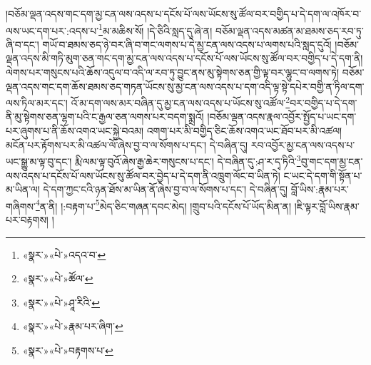 །བཅོམ་ལྡན་འདས་གང་དག་མྱ་ངན་ལས་འདས་པ་དངོས་པོ་ལས་ཡོངས་སུ་ཚོལ་བར་བགྱིད་པ་དེ་དག་ལ་འཁོར་བ་ལས་ཡང་དག་པར་:འདས་པ་\footnote{«སྣར་»«པེ་»འདའ་བ་}མ་མཆིས་སོ། །དེ་ཅིའི་སླད་དུ་ཞེ་ན། བཅོམ་ལྡན་འདས་མཚན་མ་ཐམས་ཅད་རབ་ཏུ་ཞི་བ་དང་། གཡོ་བ་ཐམས་ཅད་ཉེ་བར་ཞི་བ་གང་ལགས་པ་དེ་མྱ་ངན་ལས་འདས་པ་ལགས་པའི་སླད་དུའོ། །བཅོམ་ལྡན་འདས་མི་གཏི་མུག་ཅན་གང་དག་མྱ་ངན་ལས་འདས་པ་དངོས་པོ་ལས་ཡོངས་སུ་ཚོལ་བར་བགྱིད་པ་དེ་དག་ནི། ལེགས་པར་གསུངས་པའི་ཆོས་འདུལ་བ་འདི་ལ་རབ་ཏུ་བྱུང་ནས་མུ་སྟེགས་ཅན་གྱི་ལྟ་བར་ལྷུང་བ་ལགས་ཏེ། བཅོམ་ལྡན་འདས་གང་དག་ཆོས་ཐམས་ཅད་གཏན་ཡོངས་སུ་མྱ་ངན་ལས་འདས་པ་དག་འདི་ལྟ་སྟེ་དཔེར་བགྱི་ན་ཏིལ་དག་ལས་ཏིལ་མར་དང་། འོ་མ་དག་ལས་མར་བཞིན་དུ་མྱ་ངན་ལས་འདས་པ་ཡོངས་སུ་འཚོལ་\footnote{«སྣར་»«པེ་»ཚོལ་}བར་བགྱིད་པ་དེ་དག་ནི་མུ་སྟེགས་ཅན་ལྷག་པའི་ང་རྒྱལ་ཅན་ལགས་པར་བདག་སྨྲའོ། །བཅོམ་ལྡན་འདས་རྣལ་འབྱོར་སྤྱོད་པ་ཡང་དག་པར་ཞུགས་པ་ནི་ཆོས་འགའ་ཡང་སྐྱེ་བའམ། འགག་པར་མི་བགྱིད་ཅིང་ཆོས་འགའ་ཡང་ཐོབ་པར་མི་འཚལ། མངོན་པར་རྟོགས་པར་མི་འཚལ་ལོ་ཞེས་བྱ་བ་ལ་སོགས་པ་དང་། དེ་བཞིན་དུ། རབ་འབྱོར་མྱ་ངན་ལས་འདས་པ་ཡང་སྒྱུ་མ་ལྟ་བུ་དང་། རྨི་ལམ་ལྟ་བུའོ་ཞེས་རྒྱ་ཆེར་གསུངས་པ་དང་། དེ་བཞིན་དུ་:ཤ་ར་དྭ་ཏིའི་\footnote{«སྣར་»«པེ་»ཤཱ་རིའི་}བུ་གང་དག་མྱ་ངན་ལས་འདས་པ་དངོས་པོ་ལས་ཡོངས་སུ་ཚོལ་བར་བྱེད་པ་དེ་དག་ནི་འཁྲུག་ལོང་བ་ཡིན་ཏེ། ང་ཡང་དེ་དག་གི་སྟོན་པ་མ་ཡིན་ལ། དེ་དག་ཀྱང་ངའི་ཉན་ཐོས་མ་ཡིན་ནོ་ཞེས་བྱ་བ་ལ་སོགས་པ་དང་། དེ་བཞིན་དུ། བློ་ཡིས་:རྣམ་པར་གཞིགས་\footnote{«སྣར་»«པེ་»རྣམ་པར་ཞིག་}ན་ནི། །:བརྟག་པ་\footnote{«སྣར་»«པེ་»བརྟགས་པ་}མེད་ཅིང་གཞན་དབང་མེད། །གྲུབ་པའི་དངོས་པོ་ཡོད་མིན་ན། །ཇི་ལྟར་བློ་ཡིས་རྣམ་པར་བརྟགས། །
